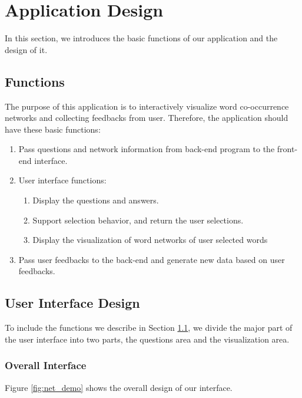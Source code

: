 \section{Application Design}
\label{sec:app}

In this section, we introduces the basic functions of our application and the design of it.


\subsection{Functions}
\label{sec:func}
The purpose of this application is to interactively visualize word co-occurrence networks and collecting feedbacks from user. Therefore, the application should have these basic functions:

\begin{enumerate}
	\item Pass questions and network information from back-end program to the front-end interface.
	\item User interface functions:
	\begin{enumerate}
		\item Display the questions and answers.
		\item Support selection behavior, and return the user selections.
		\item Display the visualization of word networks of user selected words
		\end{enumerate}
		
	\item Pass user feedbacks to the back-end and generate new data based on user feedbacks.
\end{enumerate}


\subsection{User Interface Design}


To include the functions we describe in Section \ref{sec:func}, we divide the major part of the user interface into two parts, the questions area and the visualization area.

\subsubsection{Overall Interface}

Figure \ref{fig:net_demo} shows the overall design of our interface. 

